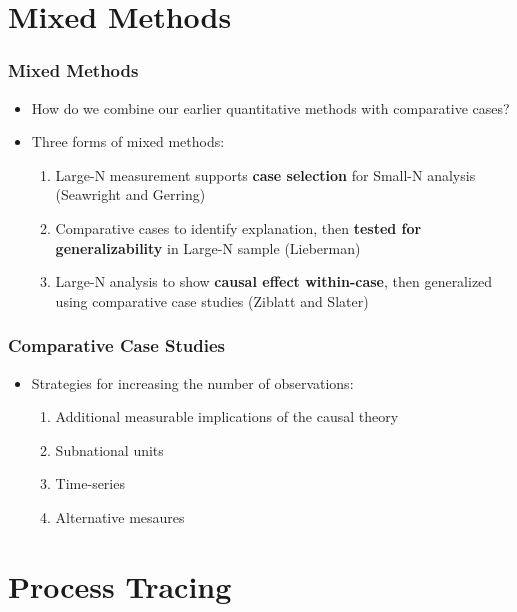 \documentclass[xcolor=x11names,compress]{beamer}\usepackage[]{graphicx}\usepackage[]{color}
\renewcommand{\(}{\begin{columns}}
\renewcommand{\)}{\end{columns}}
\newcommand{\<}[1]{\begin{column}{#1}}
\renewcommand{\>}{\end{column}}
\begin{document}
\section{Mixed Methods}

\begin{frame}
\frametitle{Mixed Methods}
\begin{itemize}
\item How do we combine our earlier quantitative methods with comparative cases?
\pause
\item Three forms of mixed methods:
\pause
\begin{enumerate}
\item Large-N measurement supports \textbf{case selection} for Small-N analysis (Seawright and Gerring)
\pause
\item Comparative cases to identify explanation, then \textbf{tested for generalizability} in Large-N sample (Lieberman)
\pause
\item Large-N analysis to show \textbf{causal effect within-case}, then generalized using comparative case studies (Ziblatt and Slater)
\end{enumerate}
\end{itemize}
\end{frame}

\begin{frame}
\frametitle{Comparative Case Studies}
\begin{itemize}
\item Strategies for increasing the number of observations:
\pause
\begin{enumerate}
\item Additional measurable implications of the causal theory
\pause
\item Subnational units
\pause
\item Time-series
\pause
\item Alternative mesaures
\end{enumerate}
\end{itemize}
\end{frame}

\section{Process Tracing} 
\end{document}
